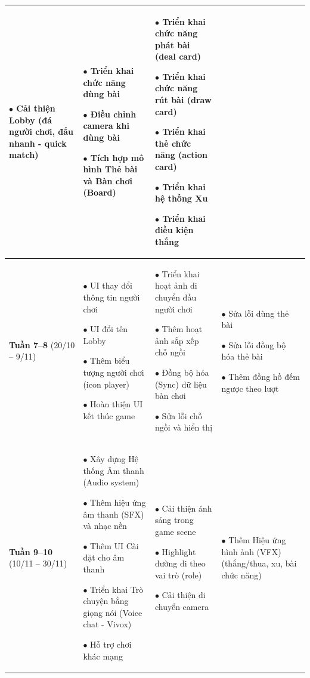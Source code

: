 \begin{longtable}{|p{2cm}|p{4cm}|p{4cm}|p{4cm}|}
    $\bullet$ Cải thiện Lobby (đá người chơi, đấu nhanh - quick match)
&
    $\bullet$ Triển khai chức năng dùng bài
    
    $\bullet$ Điều chỉnh camera khi dùng bài
    
    $\bullet$ Tích hợp mô hình Thẻ bài và Bàn chơi (Board)
&
    $\bullet$ Triển khai chức năng phát bài (deal card)
    
    $\bullet$ Triển khai chức năng rút bài (draw card)
    
    $\bullet$ Triển khai thẻ chức năng (action card)
    
    $\bullet$ Triển khai hệ thống Xu
    
    $\bullet$ Triển khai điều kiện thắng
\\
\hline

\textbf{Tuần 7--8} \newline (20/10 -- 9/11)
&
    $\bullet$ UI thay đổi thông tin người chơi
    
    $\bullet$ UI đổi tên Lobby
    
    $\bullet$ Thêm biểu tượng người chơi (icon player)
    
    $\bullet$ Hoàn thiện UI kết thúc game
&
    $\bullet$ Triển khai hoạt ảnh di chuyển đầu người chơi
    
    $\bullet$ Thêm hoạt ảnh sắp xếp chỗ ngồi 
    
    $\bullet$ Đồng bộ hóa (Sync) dữ liệu bàn chơi
    
    $\bullet$ Sửa lỗi chỗ ngồi và hiển thị
&    
    $\bullet$ Sửa lỗi dùng thẻ bài
    
    $\bullet$ Sửa lỗi đồng bộ hóa thẻ bài
    
    $\bullet$ Thêm đồng hồ đếm ngược theo lượt
\\
\hline

\textbf{Tuần 9--10} \newline (10/11 -- 30/11)
&
    $\bullet$ Xây dựng Hệ thống Âm thanh (Audio system)
    
    $\bullet$ Thêm hiệu ứng âm thanh (SFX) và nhạc nền
    
    $\bullet$ Thêm UI Cài đặt cho âm thanh
    
    $\bullet$ Triển khai Trò chuyện bằng giọng nói (Voice chat - Vivox)
    
    $\bullet$ Hỗ trợ chơi khác mạng
&
    $\bullet$ Cải thiện ánh sáng trong game scene
    
    $\bullet$ Highlight đường đi theo vai trò (role)
    
    $\bullet$ Cải thiện di chuyển camera
&
    $\bullet$ Thêm Hiệu ứng hình ảnh (VFX) (thắng/thua, xu, bài chức năng)
    

\end{longtable}

